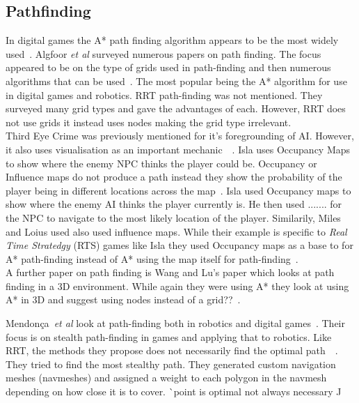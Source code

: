 \documentclass[journal]{IEEEtran}
\begin{document}
\subsection{Pathfinding}
In digital games the A* path finding algorithm appears to be the most widely used~\cite{Algfoor2015}.  Algfoor \textit{et al} surveyed numerous papers on path finding. The focus appeared to be on the type of grids used in path-finding and then numerous algorithms that can be used~\cite{Algfoor2015}. The most popular being the A* algorithm for use in digital games and robotics. RRT path-finding was not mentioned. 
They surveyed many grid types and gave the advantages of each. However, RRT does not use grids it instead uses nodes making the grid type irrelevant.\\

Third Eye Crime was previously mentioned for it's foregrounding of AI. However, it also uses visualisation as an important mechanic~\cite{Isla2014}~\cite{ game:ThirdEyeCrime}. Isla uses Occupancy Maps to show where the enemy NPC thinks the player could be. Occupancy or Influence maps do not produce a path instead they show the probability of the player being in different locations across the map~\cite{Isla2014, Miles2006}. Isla used Occupancy maps to show where the enemy AI thinks the player currently is. He then used ....... for the NPC to navigate to the most likely location of the player. Similarily, Miles and Loius used also used influence maps. While their example is specific to \textit{Real Time Stratedgy} (RTS) games like Isla they used Occupancy maps as a base to for A* path-finding instead of A* using the map itself for path-finding~\cite{Miles2006}.\\
 
A further paper on path finding is Wang and Lu's paper which looks at path finding in a 3D environment. While again they were using A* they look at using A* in 3D and suggest using nodes instead of a grid??~\cite{wang2012}.

Mendonça~\textit{et al} look at path-finding both in robotics and digital games~\cite{Mendonça2015}. Their focus is on stealth path-finding in games and applying that to robotics. Like RRT, the methods they propose does not necessarily find the optimal path~\cite{karaman2010}~\cite{Mendonça2015}. They tried to find the most stealthy path. They generated custom navigation meshes (navmeshes) and assigned a weight to each polygon in the navmesh depending on how close it is to cover. 
^^ point is optimal not always necessary ^^
\\
\end{document}
